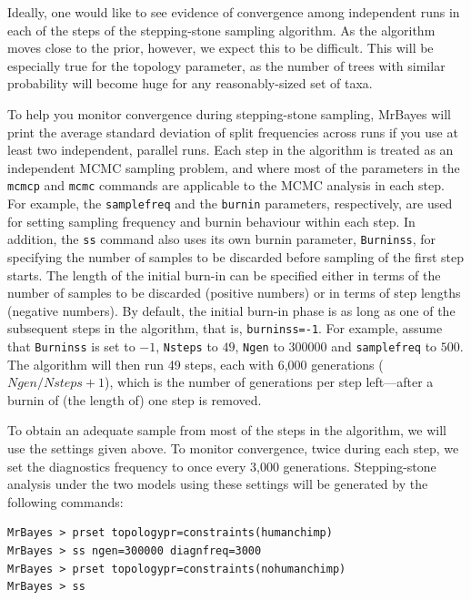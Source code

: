 \documentclass[12pt]{book}
\newcommand{\ttt}[1]{\texttt{#1}}
\begin{document}
Ideally, one would like to see evidence of convergence among independent runs in each of the steps
of the stepping-stone sampling algorithm. As the algorithm moves close to the prior, however, we
expect this to be difficult. This will be especially true for the topology parameter, as the number
of trees with similar probability will become huge for any reasonably-sized set of taxa.

To help you monitor convergence during stepping-stone sampling, MrBayes will print the average
standard deviation of split frequencies across runs if you use at least two independent, parallel
runs. Each step in the algorithm is treated as an independent MCMC sampling problem, and where most
of the parameters in the \ttt{mcmcp} and \ttt{mcmc} commands are applicable to the MCMC analysis in
each step. For example, the \ttt{samplefreq} and the \ttt{burnin} parameters, respectively, are
used for setting sampling frequency and burnin behaviour within each step. In addition, the
\ttt{ss} command also uses its own burnin parameter, \ttt{Burninss}, for specifying the number of
samples to be discarded before sampling of the first step starts. The length of the initial burn-in
can be specified either in terms of the number of samples to be discarded (positive numbers) or in
terms of step lengths (negative numbers). By default, the initial burn-in phase is as long as one
of the subsequent steps in the algorithm, that is, \ttt{burninss=-1}. For example, assume that
\ttt{Burninss} is set to $-1$, \ttt{Nsteps} to $49$, \ttt{Ngen} to $300000$ and \ttt{samplefreq} to
$500$. The algorithm will then run 49 steps, each with 6,000 generations ($Ngen/Nsteps+1$), which
is the number of generations per step left---after a burnin of (the length of) one step is
removed.

To obtain an adequate sample from most of the steps in the algorithm, we will use the settings
given above. To monitor convergence, twice during each step, we set the diagnostics frequency to
once every 3,000 generations. Stepping-stone analysis under the two models using these settings
will be generated by the following commands:

\begin{singlespacing}
\small
\begin{verbatim}
MrBayes > prset topologypr=constraints(humanchimp)
MrBayes > ss ngen=300000 diagnfreq=3000
MrBayes > prset topologypr=constraints(nohumanchimp)
MrBayes > ss
\end{verbatim}
\end{singlespacing}
\normalsize
\end{document}
